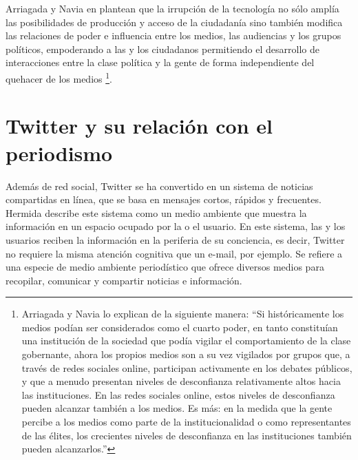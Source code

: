 Arriagada y Navia en \cite{intermedio2013} plantean que la irrupción de la tecnología no sólo amplía las posibilidades de producción y acceso de la ciudadanía sino también modifica las relaciones de poder e influencia entre los medios, las audiencias y los grupos políticos, empoderando a las y los ciudadanos permitiendo el desarrollo de interacciones entre la clase política y la gente de forma independiente del quehacer de los medios \footnote{ Arriagada y Navia lo explican de la siguiente manera: ``Si históricamente los medios podían ser considerados como el cuarto poder, en tanto constituían una institución de la sociedad que podía vigilar el comportamiento de la clase gobernante, ahora los propios medios son a su vez vigilados por grupos que, a través de redes sociales online, participan activamente en los debates públicos, y que a menudo presentan niveles de desconfianza relativamente altos hacia las instituciones. En las redes sociales online, estos niveles de desconfianza pueden alcanzar también a los medios. Es más: en la medida que la gente percibe a los medios como parte de la institucionalidad o como representantes de las élites, los crecientes niveles de desconfianza en las instituciones también pueden alcanzarlos.'' }.
\newpage

\section{Twitter y su relación con el periodismo}

Además de red social, Twitter se ha convertido en un sistema de noticias compartidas en línea, que se basa en mensajes cortos, rápidos y frecuentes. Hermida \cite{hermida2010twittering}
describe este sistema como un medio ambiente que muestra la información en un espacio ocupado por la o el usuario.
En este sistema, las y los usuarios reciben la información en la periferia de su conciencia, es decir, Twitter no requiere la misma atención cognitiva que un e-mail, por ejemplo. Se refiere a una especie de medio ambiente periodístico que ofrece diversos medios para recopilar, comunicar y compartir noticias e información. 


